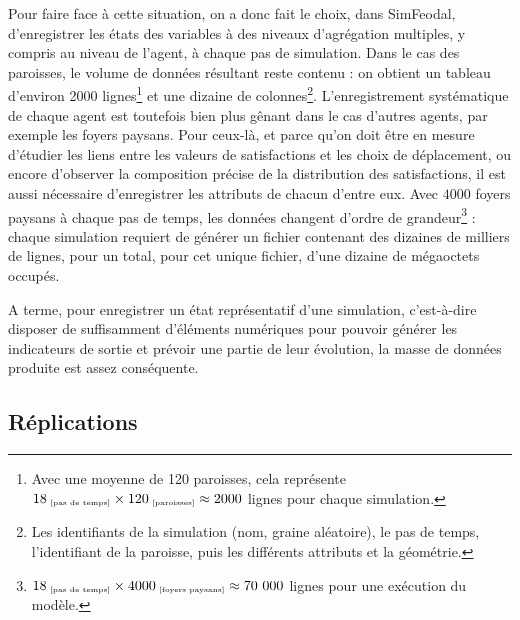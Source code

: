 	Pour faire face à cette situation, on a donc fait le choix, dans SimFeodal, d'enregistrer les états des variables à des niveaux d'agrégation multiples, y compris au niveau de l'agent, à chaque pas de simulation. Dans le cas des paroisses, le volume de données résultant reste contenu : on obtient un tableau d'environ 2000 lignes\footnote{
	Avec une moyenne de 120 paroisses, cela représente $18_{\text{\tiny ~[pas de temps]}} \times 120_{\text{\tiny ~[paroisses]}} \approx 2000$ lignes pour chaque simulation.
	} et une dizaine de colonnes\footnote{
	Les identifiants de la simulation (nom, graine aléatoire), le pas de temps, l'identifiant de la paroisse, puis les différents attributs et la géométrie.
	}.
	L'enregistrement systématique de chaque agent est toutefois bien plus gênant dans le cas d'autres agents, par exemple les foyers paysans. Pour ceux-là, et parce qu'on doit être en mesure d'étudier les liens entre les valeurs de satisfactions et les choix de déplacement, ou encore d'observer la composition précise de la distribution des satisfactions, il est aussi nécessaire d'enregistrer les attributs de chacun d'entre eux. Avec $4000$ foyers paysans à chaque pas de temps, les données changent d'ordre de grandeur\footnote{
	$18_{\text{\tiny ~[pas de temps]}} \times 4000_{\text{\tiny ~[foyers paysans]}} \approx 70~000$ lignes pour une exécution du modèle.
	} : chaque simulation requiert de générer un fichier contenant des dizaines de milliers de lignes, pour un total, pour cet unique fichier, d'une dizaine de mégaoctets occupés.

	A terme, pour enregistrer un état représentatif d'une simulation, c'est-à-dire disposer de suffisamment d'éléments numériques pour pouvoir générer les indicateurs de sortie et prévoir une partie de leur évolution, la masse de données produite est assez conséquente.

	\subsection{Réplications}\label{subsec:capter-replications}

